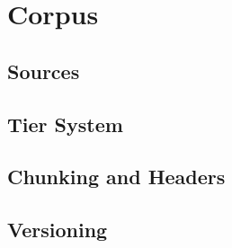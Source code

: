 \section{Corpus}


\subsection{Sources}

\subsection{Tier System}

\subsection{Chunking and Headers}

\subsection{Versioning}
